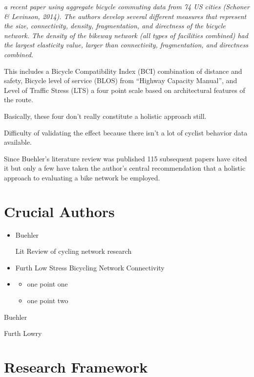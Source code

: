\documentclass[11pt]{article} %
\begin{document}
	\textit{ a recent paper using aggregate bicycle commuting data from 74 US cities (Schoner \& Levinson, 2014). The authors develop several different measures that represent the size, connectivity, density, fragmentation, and directness of the bicycle network. The density of the bikeway network (all types of facilities combined) had the largest elasticity value, larger than connectivity, fragmentation, and directness combined.}
	
	This includes a Bicycle Compatibility Index (BCI) combination of distance and safety, Bicycle level of service (BLOS) from ``Highway Capacity Manual'', \cite{Lowry} and Level of Traffic Stress (LTS) \cite{Mekuria and Furth} a four point scale based on architectural features of the route.
	
	Basically, these four don't really constitute a holistic approach still. 
	
	Difficulty of validating the effect because there isn't a lot of cyclist behavior data available.
	
	
Since Buehler's literature review was published 115 subsequent papers have cited it but only a few have taken the author's central recommendation that a holistic approach to evaluating a bike network be employed. 
	
	
	
\section{Crucial Authors}



\begin{itemize}
\item Buehler \cite{Buehler2016}

Lit Review of cycling network research

\item Furth Low Stress Bicycling Network Connectivity

\item 
  \begin{itemize}
  \item one point one
  \item one point two
  \end{itemize}
\end{itemize}

Buehler

Furth
Lowry
	
	
	
\section{Research Framework}
\end{document}
